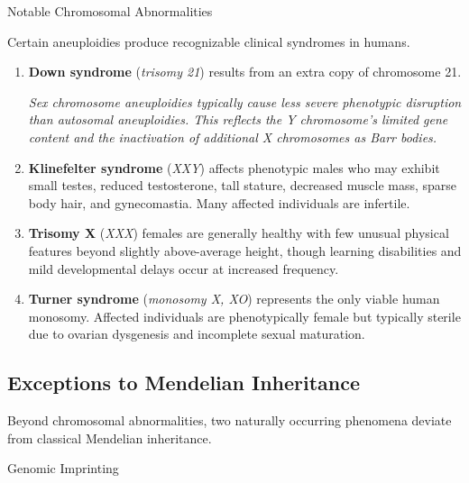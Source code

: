 \documentclass[10pt]{article}
\begin{document}
    \begin{core}{Notable Chromosomal Abnormalities}

      Certain aneuploidies produce recognizable clinical syndromes in humans.

      \begin{enumerate}

        \item \textbf{Down syndrome} (\textit{trisomy 21}) results from an extra copy of chromosome 21.

        \textit{Sex chromosome aneuploidies typically cause less severe phenotypic disruption than autosomal aneuploidies. This reflects the Y chromosome's limited gene content and the inactivation of additional X chromosomes as Barr bodies.}

        \item \textbf{Klinefelter syndrome} (\textit{XXY}) affects phenotypic males who may exhibit small testes, reduced testosterone, tall stature, decreased muscle mass, sparse body hair, and gynecomastia. Many affected individuals are infertile.

        \item \textbf{Trisomy X} (\textit{XXX}) females are generally healthy with few unusual physical features beyond slightly above-average height, though learning disabilities and mild developmental delays occur at increased frequency.

        \item \textbf{Turner syndrome} (\textit{monosomy X, XO}) represents the only viable human monosomy. Affected individuals are phenotypically female but typically sterile due to ovarian dysgenesis and incomplete sexual maturation.

      \end{enumerate}

    \end{core}
  
  \subsection{Exceptions to Mendelian Inheritance}

    Beyond chromosomal abnormalities, two naturally occurring phenomena deviate from classical Mendelian inheritance.

    \begin{core}{Genomic Imprinting}


    \end{core}
\end{document}
